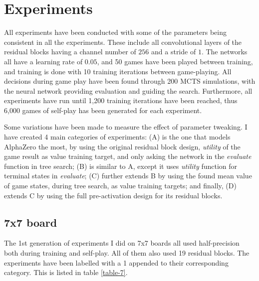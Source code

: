 \chapter{Experiments}
All experiments have been conducted with some of the parameters being consistent in all the experiments. These include all convolutional layers of the residual blocks having a channel number of $256$ and a stride of $1$. The networks all have a learning rate of $0.05$, and 50 games have been played between training, and training is done with 10 training iterations between game-playing. All decisions during game play have been found through 200 MCTS simulations, with the neural network providing evaluation and guiding the search. Furthermore, all experiments have run until 1,200 training iterations have been reached, thus 6,000 games of self-play has been generated for each experiment.

Some variations have been made to measure the effect of parameter tweaking. I have created 4 main categories of experiments: (A) is the one that models AlphaZero the most, by using the original residual block design, \textit{utility} of the game result as value training target, and only asking the network in the \textit{evaluate} function in tree search; (B) is similar to A, except it uses \textit{utility} function for terminal states in \textit{evaluate}; (C) further extends B by using the found mean value of game states, during tree search, as value training targets; and finally, (D) extends C by using the full pre-activation design for its residual blocks.

\section{7x7 board}
The 1st generation of experiments I did on 7x7 boards all used half-precision both during training and self-play. All of them also used 19 residual blocks. The experiments have been labelled with a 1 appended to their corresponding category. This is listed in table \ref{table-7}.

